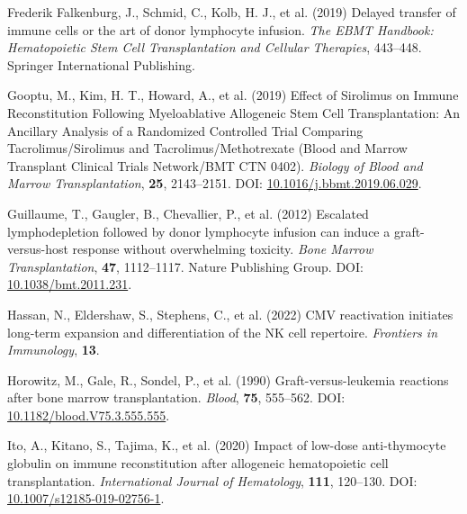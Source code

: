 \documentclass[
  letterpaper,
  DIV=11,
  numbers=noendperiod]{scrreprt}
\newlength{\cslhangindent}
\newlength{\cslentryspacingunit} %
\newenvironment{CSLReferences}[2] %
 {%
  \setlength{\parindent}{0pt}
  \ifodd #1
  \let\oldpar\par
  \def\par{\hangindent=\cslhangindent\oldpar}
  \fi
  \setlength{\parskip}{#2\cslentryspacingunit}
 }%
 {}
\begin{document}
\begin{CSLReferences}{1}{0}
\leavevmode{}%
Frederik Falkenburg, J., Schmid, C., Kolb, H. J., et al. (2019) Delayed
transfer of immune cells or the art of donor lymphocyte infusion.
\emph{The EBMT Handbook: Hematopoietic Stem Cell Transplantation and
Cellular Therapies}, 443--448. Springer International Publishing.

\leavevmode{}%
Gooptu, M., Kim, H. T., Howard, A., et al. (2019) Effect of {Sirolimus}
on {Immune Reconstitution Following Myeloablative Allogeneic Stem Cell
Transplantation}: {An Ancillary Analysis} of a {Randomized Controlled
Trial Comparing Tacrolimus}/{Sirolimus} and {Tacrolimus}/{Methotrexate}
({Blood} and {Marrow Transplant Clinical Trials Network}/{BMT CTN}
0402). \emph{Biology of Blood and Marrow Transplantation}, \textbf{25},
2143--2151. DOI:
\href{https://doi.org/10.1016/j.bbmt.2019.06.029}{10.1016/j.bbmt.2019.06.029}.

\leavevmode{}%
Guillaume, T., Gaugler, B., Chevallier, P., et al. (2012) Escalated
lymphodepletion followed by donor lymphocyte infusion can induce a
graft-versus-host response without overwhelming toxicity. \emph{Bone
Marrow Transplantation}, \textbf{47}, 1112--1117. Nature Publishing
Group. DOI:
\href{https://doi.org/10.1038/bmt.2011.231}{10.1038/bmt.2011.231}.

\leavevmode{}%
Hassan, N., Eldershaw, S., Stephens, C., et al. (2022) {CMV}
reactivation initiates long-term expansion and differentiation of the
{NK} cell repertoire. \emph{Frontiers in Immunology}, \textbf{13}.

\leavevmode{}%
Horowitz, M., Gale, R., Sondel, P., et al. (1990) Graft-versus-leukemia
reactions after bone marrow transplantation. \emph{Blood}, \textbf{75},
555--562. DOI:
\href{https://doi.org/10.1182/blood.V75.3.555.555}{10.1182/blood.V75.3.555.555}.

\leavevmode{}%
Ito, A., Kitano, S., Tajima, K., et al. (2020) Impact of low-dose
anti-thymocyte globulin on immune reconstitution after allogeneic
hematopoietic cell transplantation. \emph{International Journal of
Hematology}, \textbf{111}, 120--130. DOI:
\href{https://doi.org/10.1007/s12185-019-02756-1}{10.1007/s12185-019-02756-1}.


\end{CSLReferences}
\end{document}
